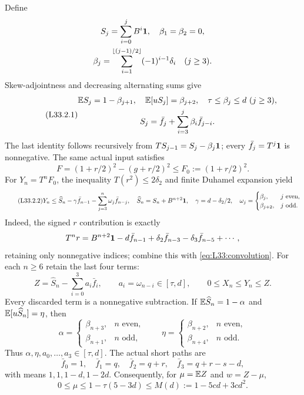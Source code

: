 Define
\[
\begin{gathered}
S_j=\sum_{i=0}^jB^i\mathbf1,\quad \beta_1=\beta_2=0,\\
\beta_j=\sum_{i=1}^{\lfloor(j-1)/2\rfloor}(-1)^{i-1}\delta_i\quad (j\ge3).
\end{gathered}
\]
Skew-adjointness and decreasing alternating sums give
\begin{equation}\tag{L33.2.1}\label{eq:L33:convolution}
\begin{gathered}
\mathbb E S_j=1-\beta_{j+1},\quad \mathbb E[uS_j]=\beta_{j+2},\quad \tau\le\beta_j\le d\ (j\ge3),\\
S_j=\bar f_j+\sum_{i=3}^j\beta_i\bar f_{j-i}.
\end{gathered}
\end{equation}
The last identity follows recursively from $TS_{j-1}=S_j-\beta_j\mathbf1$;
every $\bar f_j=T^j\mathbf1$ is nonnegative. The same actual input satisfies
\[
F=(1+r/2)^2-(g+r/2)^2\le F_0:=(1+r/2)^2.
\]
For $Y_n=T^nF_0$, the inequality $T(r^2)\le2\delta_2$ and finite
Duhamel expansion yield
\begin{equation}\tag{L33.2.2}\label{eq:L33:retention}
Y_n\le\widehat S_n-\gamma\bar f_{n-1}
-\sum_{j=3}^n\omega_j\bar f_{n-j},\quad
\widehat S_n=S_n+B^{n+2}\mathbf1,\quad\gamma=d-\delta_2/2,
\quad
\omega_j=\begin{cases}\beta_j,&j\text{ even},\\
\beta_{j+2},&j\text{ odd}.\end{cases}
\end{equation}
Indeed, the signed $r$ contribution is exactly
\[
T^nr=B^{n+2}\mathbf1-d\bar f_{n-1}+\delta_2\bar f_{n-3}
-\delta_3\bar f_{n-5}+\cdots,
\]
retaining only nonnegative indices; combine this with
\eqref{eq:L33:convolution}. For each $n\ge6$ retain the last four terms:
\begin{equation}\tag{L33.2.3}\label{eq:L33:Z}
Z=\widehat S_n-\sum_{i=0}^3a_i\bar f_i,\qquad
a_i=\omega_{n-i}\in[\tau,d],\qquad0\le X_n\le Y_n\le Z.
\end{equation}
Every discarded term is a nonnegative subtraction. If
$\mathbb E\widehat S_n=1-\alpha$ and $\mathbb E[u\widehat S_n]=\eta$, then
\[
\alpha=\begin{cases}\beta_{n+3},&n\text{ even},\\\beta_{n+1},&n\text{ odd},\end{cases}
\qquad
\eta=\begin{cases}\beta_{n+2},&n\text{ even},\\\beta_{n+4},&n\text{ odd}.\end{cases}
\]
Thus $\alpha,\allowbreak \eta,\allowbreak a_0,\allowbreak \ldots,\allowbreak a_3\in[\tau,\allowbreak d]$. The actual short paths are
\[
\bar f_0=1,\quad\bar f_1=q,\quad\bar f_2=q+r,\quad
\bar f_3=q+r-s-d,
\]
with means $1,1,1-d,1-2d$. Consequently, for $\mu=\mathbb E Z$ and $w=Z-\mu$,
\begin{equation}\tag{L33.2.5}\label{eq:L33:mean}
0\le\mu\le1-\tau(5-3d)\le M(d):=1-5cd+3cd^2.
\end{equation}

